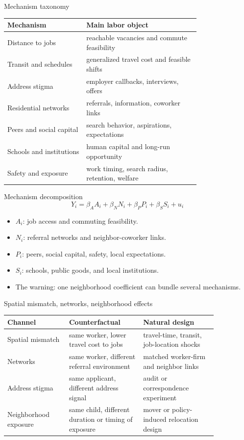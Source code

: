\documentclass[aspectratio=169,11pt]{beamer}
\begin{document}
\begin{frame}{Mechanism taxonomy}
\small
\begin{tabular}{p{0.32\linewidth} p{0.46\linewidth}}
\toprule
Mechanism & Main labor object \\
\midrule
Distance to jobs & reachable vacancies and commute feasibility \\
Transit and schedules & generalized travel cost and feasible shifts \\
Address stigma & employer callbacks, interviews, offers \\
Residential networks & referrals, information, coworker links \\
Peers and social capital & search behavior, aspirations, expectations \\
Schools and institutions & human capital and long-run opportunity \\
Safety and exposure & work timing, search radius, retention, welfare \\
\bottomrule
\end{tabular}
\end{frame}

\begin{frame}{Mechanism decomposition}
\[
Y_i = \beta_A A_i + \beta_N N_i + \beta_P P_i + \beta_S S_i + u_i
\]
\begin{itemize}
    \item $A_i$: job access and commuting feasibility.
    \item $N_i$: referral networks and neighbor-coworker links.
    \item $P_i$: peers, social capital, safety, local expectations.
    \item $S_i$: schools, public goods, and local institutions.
    \item The warning: one neighborhood coefficient can bundle several mechanisms.
\end{itemize}
\end{frame}

\begin{frame}{Spatial mismatch, networks, neighborhood effects}
\small
\begin{tabular}{p{0.25\linewidth} p{0.30\linewidth} p{0.30\linewidth}}
\toprule
Channel & Counterfactual & Natural design \\
\midrule
Spatial mismatch & same worker, lower travel cost to jobs & travel-time, transit, job-location shocks \\
Networks & same worker, different referral environment & matched worker-firm and neighbor links \\
Address stigma & same applicant, different address signal & audit or correspondence experiment \\
Neighborhood exposure & same child, different duration or timing of exposure & mover or policy-induced relocation design \\
\bottomrule
\end{tabular}
\end{frame}
\end{document}
